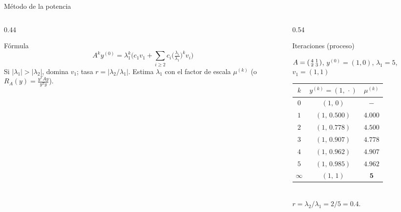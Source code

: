 \documentclass[aspectratio=169,10pt]{beamer}
\begin{document}
\begin{frame}{Método de la potencia}
\begin{columns}[T]
\begin{column}{0.44\textwidth}
\begin{cardidea}{Fórmula}{\faSuperscript}
$$A^k y^{(0)}=\lambda_1^k\Big(c_1 v_1+\!\sum_{i\ge2}\!c_i\big(\tfrac{\lambda_i}{\lambda_1}\big)^k v_i\Big)$$
{\footnotesize Si $|\lambda_1|>|\lambda_2|$, domina $v_1$; tasa $r=|\lambda_2/\lambda_1|$. Estima $\lambda_1$ con el factor de escala $\mu^{(k)}$ (o $R_A(y)=\tfrac{y^TAy}{y^Ty}$).}
\end{cardidea}
\end{column}
\begin{column}{0.54\textwidth}
\begin{cardgear}{Iteraciones (proceso)}{\faTable}
\centering
{\footnotesize $A=\begin{psmallmatrix}4&1\\2&3\end{psmallmatrix}$, $y^{(0)}=(1,0)$, $\lambda_1=5$, $v_1=(1,1)$\\[1mm]
\renewcommand{\arraystretch}{1.2}
\begin{tabular}{c|cc}
$k$ & $y^{(k)}=(1,\,\cdot)$ & $\mu^{(k)}$\\\hline
$0$&$(1,\,0)$&$-$\\ $1$&$(1,\,0.500)$&$4.000$\\ $2$&$(1,\,0.778)$&$4.500$\\ $3$&$(1,\,0.907)$&$4.778$\\ $4$&$(1,\,0.962)$&$4.907$\\ $5$&$(1,\,0.985)$&$4.962$\\ $\infty$&$(1,\,1)$&$\mathbf 5$\\
\end{tabular}}\\[1mm]
{\footnotesize $r=\lambda_2/\lambda_1=2/5=0.4$.}
\end{cardgear}
\end{column}
\end{columns}
\end{frame}
\end{document}
